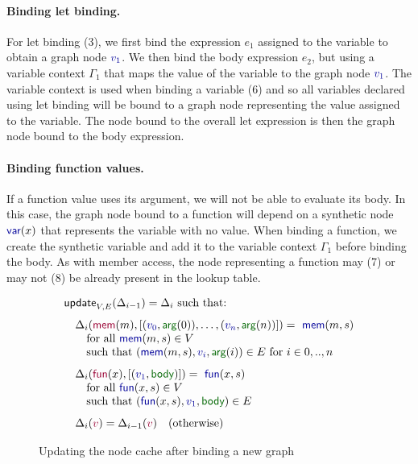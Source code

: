 \documentclass[sigplan,10pt]{acmart}\settopmatter{printfolios=true,printccs=false,printacmref=false}
\theoremstyle{plain}
\theoremstyle{definition}
\newcommand{\ident}[1]{\textnormal{\sffamily #1}}
\newcommand{\kvd}[1]{\textnormal{\textcolor{kvdclr}{\sffamily #1}}}
\newcommand{\bndclr}[1]{\textcolor{kvdclr}{#1}}
\newcommand{\bkndclr}[1]{\textcolor{prepclr}{#1}}
\newcommand{\bnd}[1]{\textnormal{\textcolor{kvdclr}{\sffamily #1}}}
\newcommand{\bknd}[1]{\textnormal{\textcolor{prepclr}{\sffamily #1}}}
\newcommand{\blbl}[1]{\textnormal{\textcolor{numclr}{\sffamily #1}}}
\begin{document}
\paragraph{Binding let binding.} For \kvd{let} binding (3), we first bind the expression $e_1$ assigned
to the variable to obtain a graph node $\bndclr{v_1}$. We then bind the body expression $e_2$,
but using a variable context $\Gamma_1$ that maps the value of the variable to the graph node
$\bndclr{v_1}$. The variable context is used when binding a variable (6) and so all variables 
declared using \kvd{let} binding will be bound to a graph node representing the value assigned 
to the variable. The node bound to the overall \kvd{let} expression is then the graph node bound
to the body expression.

\paragraph{Binding function values.} If a function value uses its argument, we will not be able
to evaluate its body. In this case, the graph node bound to a function will depend on a synthetic
node $\bnd{var}(x)$ that represents the variable with no value. When binding a function, we 
create the synthetic variable and add it to the variable context $\Gamma_1$ before binding the
body. As with member access, the node representing a function may (7) or may not (8) be already 
present in the lookup table.


\begin{figure}[!b]  
\begin{equation*}
\begin{array}{l}
\ident{update}_{V,E}(\Delta_{i-1}) = \Delta_i~\textnormal{such that:}
\\[0.75em]
\quad\Delta_{i}(\bknd{mem}(m), [(\bndclr{v_0},\blbl{arg}(0)),\ldots, (\bndclr{v_n},\blbl{arg}(n))]) = \bnd{mem}(m, s)\\
\quad\quad \textnormal{for all}~\bnd{mem}(m, s) \in V\\
\quad\quad \textnormal{such that}~(\bnd{mem}(m, s), \bndclr{v_i}, \blbl{arg}(i)) \in E~\textnormal{for}~i\in 0,..,n
\\[0.75em]
\quad\Delta_{i}(\bknd{fun}(x), [(\bndclr{v_1},\blbl{body})]) = \bnd{fun}(x, s)\\
\quad\quad \textnormal{for all}~\bnd{fun}(x, s) \in V\\
\quad\quad \textnormal{such that}~(\bnd{fun}(x, s), \bndclr{v_1}, \blbl{body}) \in E
\\[0.75em]
\quad\Delta_{i}(\bkndclr{v}) = \Delta_{i-1}(\bkndclr{v})\quad \textnormal{(otherwise)}
\end{array}
\end{equation*}
\caption{Updating the node cache after binding a new graph}
\label{fig:loop}
\vspace{0.5em}
\end{figure}
\end{document}
